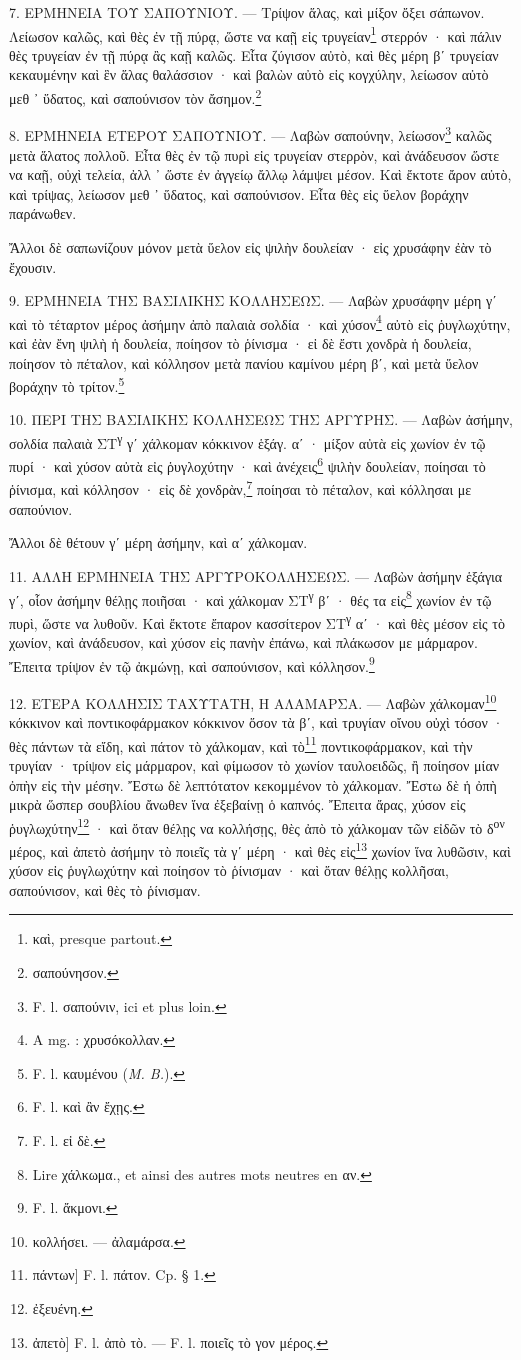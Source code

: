 \documentclass[a4paper, 11pt, oneside, polutonikogreek, french]{article}
\begin{document}
7. ΕΡΜΗΝΕΙΑ ΤΟΥ ΣΑΠΟΥΝΙΟΥ. --- Τρίψον ἅλας, καὶ μίξον ὄξει σάπωνον. Λείωσον καλῶς, καὶ θὲς ἐν τῇ πύρᾳ, ὥστε να καῇ εἰς τρυγείαν\footnote{καὶ, presque partout.} στερρόν · καὶ πάλιν θὲς τρυγείαν ἐν τῇ πύρᾳ ἂς καῇ καλῶς. Εἶτα ζύγισον αὐτὸ, καὶ θὲς μέρη βʹ τρυγείαν κεκαυμένην καὶ ἓν ἅλας θαλάσσιον · καὶ βαλὼν αὐτὸ εἰς κογχύλην, λείωσον αὐτὸ μεθ ᾽ ὕδατος, καὶ σαπούνισον τὸν ἄσημον.\footnote{σαπούνησον.}

8. ΕΡΜΗΝΕΙΑ ΕΤΕΡΟΥ ΣΑΠΟΥΝΙΟΥ. --- Λαβὼν σαπούνην, λείωσον\footnote{F. l. σαπούνιν, ici et plus loin.} καλῶς μετὰ ἅλατος πολλοῦ. Εἶτα θὲς ἐν τῷ πυρὶ εἰς τρυγείαν στερρὸν, καὶ ἀνάδευσον ὥστε να καῇ, οὐχὶ τελεία, ἀλλ ᾽ ὥστε ἐν ἀγγείῳ ἄλλῳ λάμψει μέσον. Καὶ ἔκτοτε ἄρον αὐτὸ, καὶ τρίψας, λείωσον μεθ ᾽ ὕδατος, καὶ σαπούνισον. Εἶτα θὲς εἰς ὕελον βοράχην παράνωθεν.

Ἄλλοι δὲ σαπωνίζουν μόνον μετὰ ὕελον εἰς ψιλὴν δουλείαν · εἰς χρυσάφην ἐὰν τὸ ἔχουσιν.

9. ΕΡΜΗΝΕΙΑ ΤΗΣ ΒΑΣΙΛΙΚΗΣ ΚΟΛΛΗΣΕΩΣ. --- Λαβὼν χρυσάφην μέρη γʹ καὶ τὸ τέταρτον μέρος ἀσήμην ἀπὸ παλαιὰ σολδία · καὶ χύσον\footnote{A mg. : χρυσόκολλαν.} αὐτὸ εἰς ῥυγλωχύτην, καὶ ἐὰν ἔνη ψιλὴ ἡ δουλεία, ποίησον τὸ ῥίνισμα · εἰ δὲ ἔστι χονδρὰ ἡ δουλεία, ποίησον τὸ πέταλον, καὶ κόλλησον μετὰ πανίου καμίνου μέρη βʹ, καὶ μετὰ ὕελον βοράχην τὸ τρίτον.\footnote{F. l. καυμένου (\emph{M. B.}).}

10. ΠΕΡΙ ΤΗΣ ΒΑΣΙΛΙΚΗΣ ΚΟΛΛΗΣΕΩΣ ΤΗΣ ΑΡΓΥΡΗΣ. --- Λαβὼν ἀσήμην, σολδία παλαιὰ ΣΤ\textsuperscript{γ} γʹ χάλκομαν κόκκινον ἑξάγ. αʹ · μίξον αὐτὰ εἰς χωνίον ἐν τῷ πυρί · καὶ χύσον αὐτὰ εἰς ῥυγλοχύτην · καὶ ἀνέχεις\footnote{F. l. καὶ ἂν ἔχῃς.} ψιλὴν δουλείαν, ποίησαι τὸ ῥίνισμα, καὶ κόλλησον · εἰς δὲ χονδρὰν,\footnote{F. l. εἰ δὲ.} ποίησαι τὸ πέταλον, καὶ κόλλησαι με σαπούνιον.

Ἄλλοι δὲ θέτουν γʹ μέρη ἀσήμην, καὶ αʹ χάλκομαν.

11. ΑΛΛΗ ΕΡΜΗΝΕΙΑ ΤΗΣ ΑΡΓΥΡΟΚΟΛΛΗΣΕΩΣ. --- Λαβὼν ἀσήμην ἑξάγια γʹ, οἷον ἀσήμην θέλῃς ποιῆσαι · καὶ χάλκομαν ΣΤ\textsuperscript{γ} βʹ · θές τα εἰς\footnote{Lire χάλκωμα., et ainsi des autres mots neutres en αν.} χωνίον ἐν τῷ πυρὶ, ὥστε να λυθοῦν. Καὶ ἔκτοτε ἔπαρον κασσίτερον ΣΤ\textsuperscript{γ} αʹ · καὶ θὲς μέσον εἰς τὸ χωνίον, καὶ ἀνάδευσον, καὶ χύσον εἰς πανὴν ἐπάνω, καὶ πλάκωσον με μάρμαρον. Ἔπειτα τρίψον ἐν τῷ ἀκμώνῃ, καὶ σαπούνισον, καὶ κόλλησον.\footnote{F. l. ἄκμονι.}

12. ΕΤΕΡΑ ΚΟΛΛΗΣΙΣ ΤΑΧΥΤΑΤΗ, Η ΑΛΑΜΑΡΣΑ. --- Λαβὼν χάλκομαν\footnote{κολλήσει. --- ἀλαμάρσα.} κόκκινον καὶ ποντικοφάρμακον κόκκινον ὅσον τὰ βʹ, καὶ τρυγίαν οἴνου οὐχὶ τόσον · θὲς πάντων τὰ εἴδη, καὶ πάτον τὸ χάλκομαν, καὶ τὸ\footnote{πάντων] F. l. πάτον. Cp. § 1.} ποντικοφάρμακον, καὶ τὴν τρυγίαν · τρίψον εἰς μάρμαρον, καὶ φίμωσον τὸ χωνίον ταυλοειδῶς, ἢ ποίησον μίαν ὀπὴν εἰς τὴν μέσην. Ἔστω δὲ λεπτότατον κεκομμένον τὸ χάλκομαν. Ἔστω δὲ ἡ ὀπὴ μικρὰ ὥσπερ σουβλίου ἄνωθεν ἵνα ἐξεβαίνῃ ὁ καπνός. Ἔπειτα ἄρας, χύσον εἰς ῥυγλωχύτην\footnote{ἐξευένη.} · καὶ ὅταν θέλῃς να κολλήσῃς, θὲς ἀπὸ τὸ χάλκομαν τῶν εἰδῶν τὸ δ\textsuperscript{ον} μέρος, καὶ ἀπετὸ ἀσήμην τὸ ποιεῖς τὰ γʹ μέρη · καὶ θὲς εἰς\footnote{ἀπετὸ] F. l. ἀπὸ τὸ. --- F. l. ποιεῖς τὸ γον μέρος.} χωνίον ἵνα λυθῶσιν, καὶ χύσον εἰς ῥυγλωχύτην καὶ ποίησον τὸ ῥίνισμαν · καὶ ὅταν θέλῃς κολλῆσαι, σαπούνισον, καὶ θὲς τὸ ῥίνισμαν.
\end{document}
